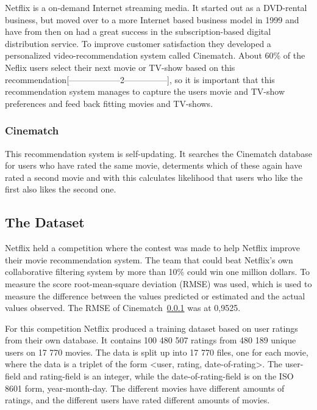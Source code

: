 Netflix is a on-demand Internet streaming media. It started out as a DVD-rental business, but moved over to a more Internet based business model in 1999 and have from then on had a great success in the subscription-based digital distribution service. To improve customer satisfaction they developed a personalized video-recommendation system called Cinematch. About 60\% of the Neflix users select their next movie or TV-show based on this recommendation[------------------2---------------], so it is important that this recommendation system manages to capture the users movie and TV-show preferences and feed back fitting movies and TV-shows.

\subsubsection{Cinematch}
\label{subsec:Cinematch}
This recommendation system is self-updating. It searches the Cinematch database for users who have rated the same movie, determents which of these again have rated a second movie and with this calculates likelihood that users who like the first also likes the second one.


\subsection{The Dataset}

Netflix held a competition where the contest was made to help Netflix improve their movie recommendation system. The team that could beat Netflix's own collaborative filtering system by more than 10\% could win one million dollars. To measure the score root-mean-square deviation (RMSE) was used, which is used to measure the difference between the values predicted or estimated and the actual values observed. The RMSE of Cinematch~\ref{subsec:Cinematch} was at 0,9525.

For this competition Netflix produced a training dataset based on user ratings from their own database. It contains 100 480 507 ratings from 480 189 unique users on 17 770 movies. The data is split up into 17 770 files, one for each movie, where the data is a triplet of the form <user, rating, date-of-rating>. The user-field and rating-field is an integer, while the date-of-rating-field is on the ISO 8601 form, year-month-day. The different movies have different amounts of ratings, and the different users have rated different amounts of movies.

